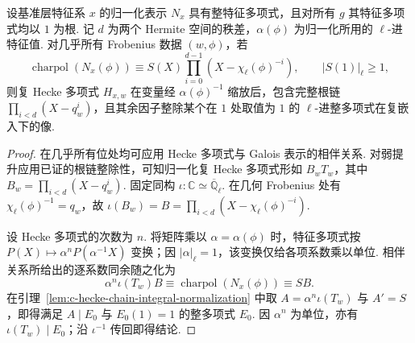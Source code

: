\begin{lemma}
\label{lem:c-hecke-local-root-chain}
\emitthmsource
设基准层特征系 $x$ 的归一化表示 $N_x$ 具有整特征多项式，且对所有 $g$ 其特征多项式均以 $1$ 为根. 记 $d$ 为两个 Hermite 空间的秩差，$\alpha(\phi)$ 为归一化所用的 $\ell$-进特征值. 对几乎所有 Frobenius 数据 $(w,\phi)$，若
\[
 \operatorname{charpol}(N_x(\phi))\equiv S(X)\prod_{i=0}^{d-1}(X-\chi_\ell(\phi)^{-i}),
 \qquad |S(1)|_\ell\ge1 ,
\]
则复 Hecke 多项式 $H_{x,w}$ 在变量经 $\alpha(\phi)^{-1}$ 缩放后，包含完整根链 $\prod_{i<d}(X-q_w^i)$，且其余因子整除某个在 $1$ 处取值为 $1$ 的 $\ell$-进整多项式在复嵌入下的像.
\end{lemma}
\begin{proof}
在几乎所有位处均可应用 Hecke 多项式与 Galois 表示的相伴关系. 对弱提升应用已证的根链整除性，可知归一化复 Hecke 多项式形如 $B_w T_w$，其中 $B_w=\prod_{i<d}(X-q_w^i)$. 固定同构 $\iota\colon\mathbb C\simeq\overline{\mathbb Q}_\ell$. 在几何 Frobenius 处有 $\chi_\ell(\phi)^{-1}=q_w$，故 $\iota(B_w)=B=\prod_{i<d}(X-\chi_\ell(\phi)^{-i})$.

设 Hecke 多项式的次数为 $n$. 将矩阵乘以 $\alpha=\alpha(\phi)$ 时，特征多项式按 $P(X)\mapsto\alpha^n P(\alpha^{-1}X)$ 变换；因 $|\alpha|_\ell=1$，该变换仅给各项系数乘以单位. 相伴关系所给出的逐系数同余随之化为
\[
 \alpha^n\iota(T_w)B\equiv\operatorname{charpol}(N_x(\phi))\equiv S B .
\]
在引理~\ref{lem:c-hecke-chain-integral-normalization} 中取 $A=\alpha^n\iota(T_w)$ 与 $A'=S$，即得满足 $A\mid E_0$ 与 $E_0(1)=1$ 的整多项式 $E_0$. 因 $\alpha^n$ 为单位，亦有 $\iota(T_w)\mid E_0$；沿 $\iota^{-1}$ 传回即得结论.
\end{proof}

